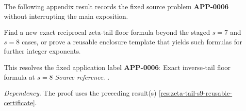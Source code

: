 The following appendix result records the fixed source problem \textbf{APP-0006} \cite{kim-song-tail} without interrupting the main exposition.
\begin{corollary}[APP-0006: Exact inverse-tail floor formula at s=8]
\label{res:zeta-tail-floor-next-case}
Find a new exact reciprocal zeta-tail floor formula beyond the staged \(s=7\) and \(s=8\) cases, or prove a reusable enclosure template that yields such formulas for further integer exponents.

This resolves the fixed application label \textbf{APP-0006}: Exact inverse-tail floor formula at \(s=8\)
\emph{Source reference.} \cite{kim-song-tail}.

\emph{Dependency.} The proof uses the preceding result(s) \ref{res:zeta-tail-s9-reusable-certificate}.
\end{corollary}
